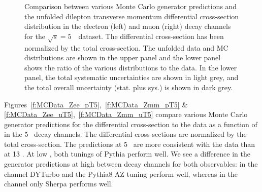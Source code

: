 \begin{figure}[h]
\centering
{}

\caption{Comparison between various Monte Carlo generator predictions and the unfolded dilepton transverse momentum differential cross-section distribution in the electron (left) and muon (right) \Zboson decay channels for the $\sqrt{s} = 5$~\TeV\ dataset. The differential cross-section has been normalized by the total cross-section. The unfolded data and MC distributions are shown in the upper panel and the lower panel shows the ratio of the various distributions to the data. In the lower panel, the total systematic uncertainties are shown in light grey, and the total overall uncertainty (stat. plus sys.) is shown in dark grey.}\label{f:MCData_Z_5}
\end{figure}

Figures~\ref{f:MCData_Zee_pT5},~\ref{f:MCData_Zmm_pT5} \& \ref{f:MCData_Zee_uT5},~\ref{f:MCData_Zmm_uT5} compare various Monte Carlo generator predictions for the differential \pTZ cross-section to the data as a function of \pT in the 5 \TeV\ decay channels. The differential cross-sections are normalized by the total cross-section. The predictions at 5 \TeV\ are more consistent with the data than at 13 \TeV. At low \pT, both tunings of Pythia perform well. We see a difference in the generator predictions at high \pT between decay channels for both observables: in the \Zee channel DYTurbo and the Pythia8 AZ tuning perform well, whereas in the \Zmm channel only Sherpa performs well.


\clearpage

\clearpage

%
